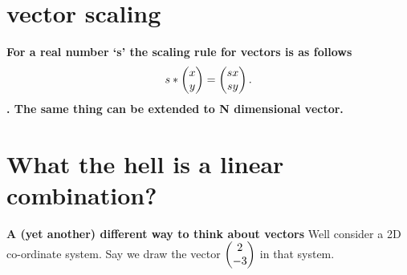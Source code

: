 \documentclass[../main.tex]{subfiles}
\begin{document}
\chapter{vector scaling}

\begin{definition}
  \label{def:vector_scaling}

  \textbf{For a real number `s' the scaling rule for vectors is as follows \[
s * \blockcomment{Column-Vector: x, y} \begin{pmatrix} x \\  y \end{pmatrix} = \blockcomment{Column-Vector: sx, sy} \begin{pmatrix} sx \\  sy \end{pmatrix}
.\]. The same thing can be extended to N dimensional vector.}


\end{definition}

\chapter{What the hell is a linear combination?}

\textbf{A (yet another) different way to think about vectors}
Well consider a 2D co-ordinate system. Say we draw the vector $ \blockcomment{Column-Vector: 2, -3} \begin{pmatrix} 2 \\  -3 \end{pmatrix} $ in that system.

\begin{figure}[h]
  \centering
\end{figure}
\end{document}
